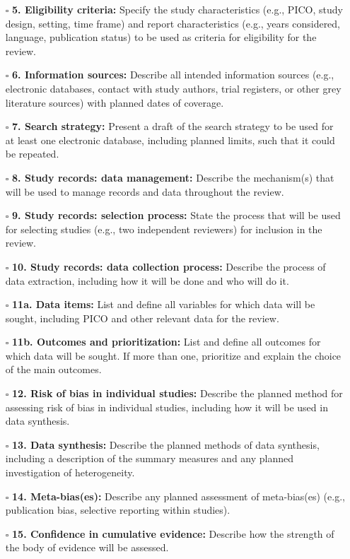 \documentclass[11pt]{article}
\def\tightlist{}
\begin{document}
\begin{Form}
\begin{itemize}
\tightlist
\item[$\square$]
  \textbf{5. Eligibility criteria:} Specify the study characteristics
  (e.g., PICO, study design, setting, time frame) and report
  characteristics (e.g., years considered, language, publication status)
  to be used as criteria for eligibility for the review.
\item[$\square$]
  \textbf{6. Information sources:} Describe all intended information
  sources (e.g., electronic databases, contact with study authors, trial
  registers, or other grey literature sources) with planned dates of
  coverage.
\item[$\square$]
  \textbf{7. Search strategy:} Present a draft of the search strategy to
  be used for at least one electronic database, including planned
  limits, such that it could be repeated.
\item[$\square$]
  \textbf{8. Study records: data management:} Describe the mechanism(s)
  that will be used to manage records and data throughout the review.
\item[$\square$]
  \textbf{9. Study records: selection process:} State the process that
  will be used for selecting studies (e.g., two independent reviewers)
  for inclusion in the review.
\item[$\square$]
  \textbf{10. Study records: data collection process:} Describe the
  process of data extraction, including how it will be done and who will
  do it.
\item[$\square$]
  \textbf{11a. Data items:} List and define all variables for which data
  will be sought, including PICO and other relevant data for the review.
\item[$\square$]
  \textbf{11b. Outcomes and prioritization:} List and define all
  outcomes for which data will be sought. If more than one, prioritize
  and explain the choice of the main outcomes.
\item[$\square$]
  \textbf{12. Risk of bias in individual studies:} Describe the planned
  method for assessing risk of bias in individual studies, including how
  it will be used in data synthesis.
\item[$\square$]
  \textbf{13. Data synthesis:} Describe the planned methods of data
  synthesis, including a description of the summary measures and any
  planned investigation of heterogeneity.
\item[$\square$]
  \textbf{14. Meta-bias(es):} Describe any planned assessment of
  meta-bias(es) (e.g., publication bias, selective reporting within
  studies).
\item[$\square$]
  \textbf{15. Confidence in cumulative evidence:} Describe how the
  strength of the body of evidence will be assessed.
\end{itemize}


\end{Form}
\end{document}
